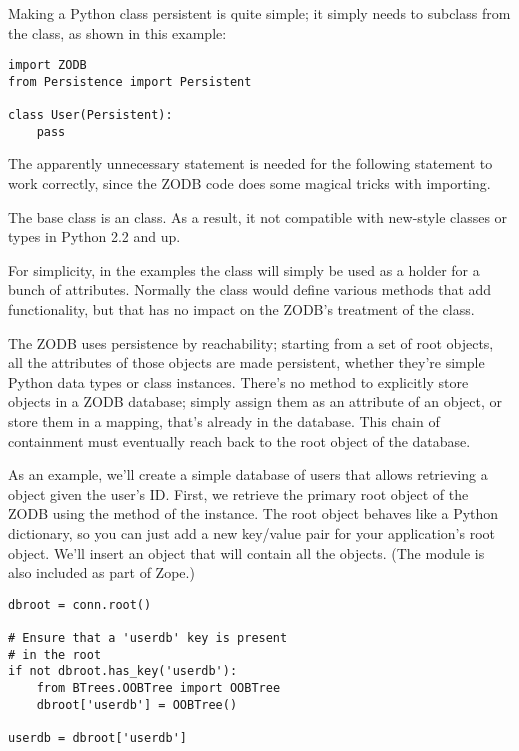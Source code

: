 Making a Python class persistent is quite simple; it simply needs to
subclass from the  class, as shown in this example:

\begin{verbatim}
import ZODB
from Persistence import Persistent

class User(Persistent):
    pass
\end{verbatim}

The apparently unnecessary  statement is
needed for the following  statement to work
correctly, since the ZODB code does some magical tricks with
importing.

The  base class is an 
class.  As a result, it not compatible with new-style classes or types
in Python 2.2 and up.

For simplicity, in the examples the  class will
simply be used as a holder for a bunch of attributes.  Normally the
class would define various methods that add functionality, but that
has no impact on the ZODB's treatment of the class.

The ZODB uses persistence by reachability; starting from a set of root
objects, all the attributes of those objects are made persistent,
whether they're simple Python data types or class instances.  There's
no method to explicitly store objects in a ZODB database; simply
assign them as an attribute of an object, or store them in a mapping,
that's already in the database.  This chain of containment must
eventually reach back to the root object of the database.

As an example, we'll create a simple database of users that allows
retrieving a  object given the user's ID.  First, we
retrieve the primary root object of the ZODB using the 
method of the  instance.  The root object behaves
like a Python dictionary, so you can just add a new key/value pair for
your application's root object.  We'll insert an  object
that will contain all the  objects.  (The
 module is also included as part of Zope.)

\begin{verbatim}
dbroot = conn.root()

# Ensure that a 'userdb' key is present 
# in the root
if not dbroot.has_key('userdb'):
    from BTrees.OOBTree import OOBTree
    dbroot['userdb'] = OOBTree()

userdb = dbroot['userdb']
\end{verbatim}

